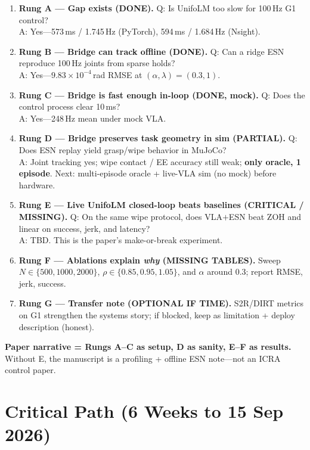 \documentclass[conference]{IEEEtran}
\begin{document}
\begin{enumerate}
    \item \textbf{Rung A --- Gap exists (DONE).}
        Q: Is UnifoLM too slow for 100\,Hz G1 control?\\
        A: Yes---573\,ms / 1.745\,Hz (PyTorch), 594\,ms / 1.684\,Hz (Nsight).
    \item \textbf{Rung B --- Bridge can track offline (DONE).}
        Q: Can a ridge ESN reproduce 100\,Hz joints from sparse holds?\\
        A: Yes---$9.83\times10^{-4}$\,rad RMSE at $(\alpha,\lambda)=(0.3,1)$.
    \item \textbf{Rung C --- Bridge is fast enough in-loop (DONE, mock).}
        Q: Does the control process clear 10\,ms?\\
        A: Yes---248\,Hz mean under mock VLA.
    \item \textbf{Rung D --- Bridge preserves task geometry in sim (PARTIAL).}
        Q: Does ESN replay yield grasp/wipe behavior in MuJoCo?\\
        A: Joint tracking yes; wipe contact / EE accuracy still weak; \textbf{only oracle, 1 episode}.
        Next: multi-episode oracle + live-VLA sim (no mock) before hardware.
    \item \textbf{Rung E --- Live UnifoLM closed-loop beats baselines (CRITICAL / MISSING).}
        Q: On the same wipe protocol, does VLA$+$ESN beat ZOH and linear on success, jerk, and latency?\\
        A: TBD. This is the paper's make-or-break experiment.
    \item \textbf{Rung F --- Ablations explain \emph{why} (MISSING TABLES).}
        Sweep $N\in\{500,1000,2000\}$, $\rho\in\{0.85,0.95,1.05\}$, and $\alpha$ around 0.3; report RMSE, jerk, success.
    \item \textbf{Rung G --- Transfer note (OPTIONAL IF TIME).}
        S2R/DIRT metrics on G1 strengthen the systems story; if blocked, keep as limitation + deploy description (honest).
\end{enumerate}

\noindent\textbf{Paper narrative = Rungs A--C as setup, D as sanity, E--F as results.}
Without E, the manuscript is a profiling + offline ESN note---not an ICRA control paper.

\section{Critical Path (6 Weeks to 15 Sep 2026)}
\end{document}
